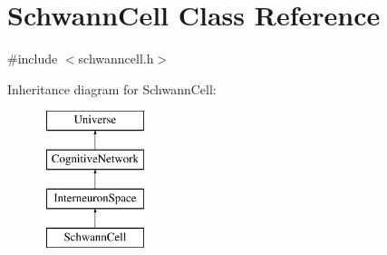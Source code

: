 \hypertarget{classSchwannCell}{}\section{Schwann\+Cell Class Reference}
\label{classSchwannCell}


{\ttfamily \#include $<$schwanncell.\+h$>$}

Inheritance diagram for Schwann\+Cell\+:\begin{figure}[H]
\begin{center}
\leavevmode
\includegraphics[height=4.000000cm]{classSchwannCell}
\end{center}
\end{figure}
